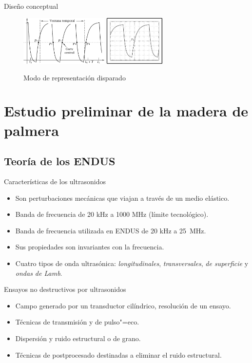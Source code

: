 \documentclass[utf8, compress]			{beamer}
\begin{document}
\begin{frame}{Diseño conceptual}
    \begin{figure}
	\hfill
	\includegraphics[height=25mm, keepaspectratio]{ventana.pdf}
	\hspace{3em}
	\includegraphics[height=25mm, keepaspectratio]{disparo.pdf}
	\hfill
	\caption{Modo de representación disparado}
	\label{fig:continuous}
    \end{figure}
\end{frame}


\section{Estudio preliminar de la madera de palmera}

\subsection{Teoría de los ENDUS}

\begin{frame}{Características de los ultrasonidos}
    \begin{itemize}
	\item Son perturbaciones mecánicas que viajan a través de un medio
	    elástico.
	\item Banda de frecuencia de 20 kHz a 1000 MHz (límite
	    tecnológico).
	\item Banda de frecuencia utilizada en ENDUS de 20 kHz a 25~MHz.
	\item Sus propiedades son invariantes con la frecuencia.
	\item Cuatro tipos de onda ultrasónica: \emph{longitudinales},
	    \emph{transversales}, \emph{de superficie} y \emph{ondas de
	    Lamb}.
    \end{itemize}
\end{frame}

\begin{frame}{Ensayos no destructivos por ultrasonidos}
    \begin{itemize}
	\item Campo generado por un transductor cilíndrico, resolución de
	    un ensayo.
	\item Técnicas de transmisión y de pulso"=eco.
	\item Dispersión y ruido estructural o de grano.
	\item Técnicas de postprocesado destinadas a eliminar el ruido
	    estructural.
    \end{itemize}
\end{frame}
\end{document}
